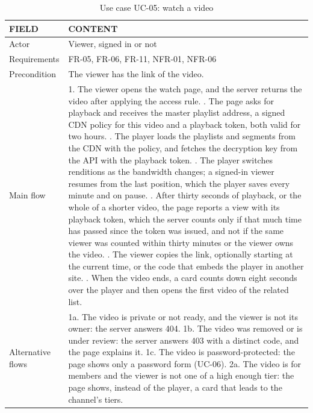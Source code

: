 \begin{table}[H]
\centering
\caption{Use case UC-05: watch a video}
\label{tab:uc-watch}
\small
\begin{tabularx}{\textwidth}{p{} X}
\toprule
\textbf{FIELD} & \textbf{CONTENT} \\
\midrule
Actor & Viewer, signed in or not \\
Requirements & FR-05, FR-06, FR-11, NFR-01, NFR-06 \\
Precondition & The viewer has the link of the video. \\
Main flow &
  1. The viewer opens the watch page, and the server returns the video after applying the access rule. \newline
  2. The page asks for playback and receives the master playlist address, a signed CDN policy for this video and a playback token, both valid for two hours. \newline
  3. The player loads the playlists and segments from the CDN with the policy, and fetches the decryption key from the API with the playback token. \newline
  4. The player switches renditions as the bandwidth changes; a signed-in viewer resumes from the last position, which the player saves every minute and on pause. \newline
  5. After thirty seconds of playback, or the whole of a shorter video, the page reports a view with its playback token, which the server counts only if that much time has passed since the token was issued, and not if the same viewer was counted within thirty minutes or the viewer owns the video. \newline
  6. The viewer copies the link, optionally starting at the current time, or the code that embeds the player in another site. \newline
  7. When the video ends, a card counts down eight seconds over the player and then opens the first video of the related list. \\
Alternative flows &
  1a. The video is private or not ready, and the viewer is not its owner: the server answers 404. \newline
  1b. The video was removed or is under review: the server answers 403 with a distinct code, and the page explains it. \newline
  1c. The video is password-protected: the page shows only a password form (UC-06). \newline
  2a. The video is for members and the viewer is not one of a high enough tier: the page shows, instead of the player, a card that leads to the channel's tiers. \newline

\end{tabularx}
\end{table}
